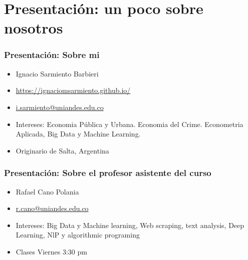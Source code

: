 \documentclass[
  shownotes,
  xcolor={svgnames},
  hyperref={colorlinks,citecolor=DarkBlue,linkcolor=DarkRed,urlcolor=DarkBlue}
  , aspectratio=169]{beamer}
\begin{document}

\section{Presentación: un poco sobre nosotros}
\begin{frame}
\frametitle{Presentación: Sobre mi}

  \begin{itemize}
      \item  Ignacio Sarmiento Barbieri
      \medskip
      \item \url{https://ignaciomsarmiento.github.io/}
      \medskip
      \item \href{mailto:i.sarmiento@uniandes.edu.co}{i.sarmiento@uniandes.edu.co}
      \medskip
      \item Intereses: Economia Pública y Urbana. Economia del Crime. Econometria Aplicada, Big Data y Machine Learning.
      \medskip
      \item Originario de Salta, Argentina
  \end{itemize}

\end{frame}


\begin{frame}
\frametitle{Presentación: Sobre el profesor asistente del curso}

  \begin{itemize}
      \item  Rafael Cano Polania
      \medskip
      \item \href{mailto:r.cano@uniandes.edu.co}{r.cano@uniandes.edu.co}
      \medskip
      \item Intereses: Big Data y Machine learning, Web scraping, text analysis, Deep Learning, NlP y algorithmic programing
      \medskip
      \item Clases Viernes 3:30 pm

  \end{itemize}

\end{frame}


\end{document}
